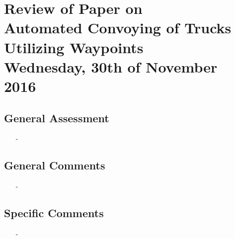 
\renewcommand{\vec}[1]{\boldsymbol{\mathbf{#1}}}

\renewcommand\chaptername{KAPITEL}
\renewcommand\contentsname{Indhold}
\renewcommand\figurename{Figur}
\renewcommand\tablename{Tabel}

\section*{Review of Paper on\\
Automated Convoying of Trucks Utilizing Waypoints\\
\small Wednesday, 30th of November 2016}
\subsection{General Assessment}
\begin{itemize}
	\item[-]
\end{itemize}
\subsection{General Comments}
\begin{itemize}
	\item[-] 
\end{itemize}	
\subsection{Specific Comments}
\begin{itemize}
	\item[-]
\end{itemize}

